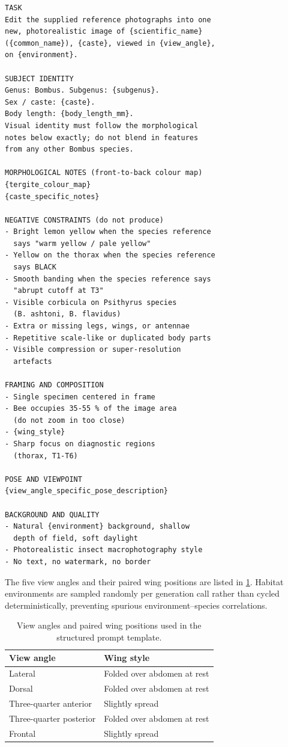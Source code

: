\documentclass[runningheads]{llncs}
\begin{document}
\begin{lstlisting}[basicstyle=\ttfamily\footnotesize,
                   breaklines=true,frame=single,
                   xleftmargin=0.5em,xrightmargin=0.5em]
TASK
Edit the supplied reference photographs into one
new, photorealistic image of {scientific_name}
({common_name}), {caste}, viewed in {view_angle},
on {environment}.

SUBJECT IDENTITY
Genus: Bombus. Subgenus: {subgenus}.
Sex / caste: {caste}.
Body length: {body_length_mm}.
Visual identity must follow the morphological
notes below exactly; do not blend in features
from any other Bombus species.

MORPHOLOGICAL NOTES (front-to-back colour map)
{tergite_colour_map}
{caste_specific_notes}

NEGATIVE CONSTRAINTS (do not produce)
- Bright lemon yellow when the species reference
  says "warm yellow / pale yellow"
- Yellow on the thorax when the species reference
  says BLACK
- Smooth banding when the species reference says
  "abrupt cutoff at T3"
- Visible corbicula on Psithyrus species
  (B. ashtoni, B. flavidus)
- Extra or missing legs, wings, or antennae
- Repetitive scale-like or duplicated body parts
- Visible compression or super-resolution
  artefacts

FRAMING AND COMPOSITION
- Single specimen centered in frame
- Bee occupies 35-55 % of the image area
  (do not zoom in too close)
- {wing_style}
- Sharp focus on diagnostic regions
  (thorax, T1-T6)

POSE AND VIEWPOINT
{view_angle_specific_pose_description}

BACKGROUND AND QUALITY
- Natural {environment} background, shallow
  depth of field, soft daylight
- Photorealistic insect macrophotography style
- No text, no watermark, no border
\end{lstlisting}

The five view angles and their paired wing positions are listed in
\cref{tab:suppl-viewpoints}. Habitat environments are sampled randomly
per generation call rather than cycled deterministically, preventing
spurious environment--species correlations.

\begin{table}[t]
  \caption{View angles and paired wing positions used in the structured
  prompt template.}
  \label{tab:suppl-viewpoints}
  \centering
  \begin{tabular}{@{}ll@{}}
    \toprule
    \textbf{View angle}      & \textbf{Wing style} \\
    \midrule
    Lateral                  & Folded over abdomen at rest \\
    Dorsal                   & Folded over abdomen at rest \\
    Three-quarter anterior   & Slightly spread \\
    Three-quarter posterior  & Folded over abdomen at rest \\
    Frontal                  & Slightly spread \\
    \bottomrule
  \end{tabular}
\end{table}
\end{document}
